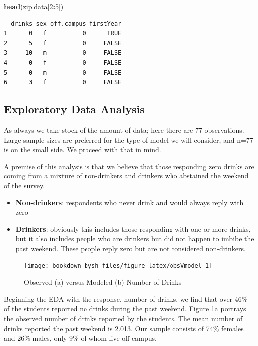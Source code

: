 \documentclass[
]{krantz}
\newenvironment{Shaded}{\begin{snugshade}}{\end{snugshade}}
\newcommand{\DecValTok}[1]{\textcolor[rgb]{0.06,0.06,0.06}{#1}}
\newcommand{\KeywordTok}[1]{\textcolor[rgb]{0.27,0.27,0.27}{\textbf{#1}}}
\newcommand{\NormalTok}[1]{#1}
\newcommand{\OperatorTok}[1]{\textcolor[rgb]{0.43,0.43,0.43}{\textbf{#1}}}
\providecommand{\tightlist}{%
  \setlength{\itemsep}{0pt}\setlength{\parskip}{0pt}}
\begin{document}
\begin{Shaded}
\begin{Highlighting}[]
\KeywordTok{head}\NormalTok{(zip.data[}\DecValTok{2}\OperatorTok{:}\DecValTok{5}\NormalTok{])}
\end{Highlighting}
\end{Shaded}

\begin{verbatim}
  drinks sex off.campus firstYear
1      0   f          0      TRUE
2      5   f          0     FALSE
3     10   m          0     FALSE
4      0   f          0     FALSE
5      0   m          0     FALSE
6      3   f          0     FALSE
\end{verbatim}

\hypertarget{exploratory-data-analysis-1}{%
\subsection{Exploratory Data Analysis}\label{exploratory-data-analysis-1}}

As always we take stock of the amount of data; here there are 77 observations. Large sample sizes are preferred for the type of model we will consider, and n=77 is on the small side. We proceed with that in mind.

A premise of this analysis is that we believe that those responding zero drinks are coming from a mixture of non-drinkers and drinkers who abstained the weekend of the survey.

\begin{itemize}
\tightlist
\item
  \textbf{Non-drinkers}: respondents who never drink and would always reply with zero
\item
  \textbf{Drinkers}: obviously this includes those responding with one or more drinks, but it also includes people who are drinkers but did not happen to imbibe the past weekend. These people reply zero but are not considered non-drinkers.
\end{itemize}

\begin{figure}

{\centering \texttt{[image: bookdown-bysh\_files/figure-latex/obsVmodel-1]} 

}

\caption{Observed (a) versus Modeled (b) Number of Drinks}\label{fig:obsVmodel}
\end{figure}

Beginning the EDA with the response, number of drinks, we find that over 46\% of the students reported no drinks during the past weekend. Figure \ref{fig:obsVmodel}a portrays the observed number of drinks reported by the students. The mean number of drinks reported the past weekend is 2.013. Our sample consists of 74\% females and 26\% males, only 9\% of whom live off campus.
\end{document}
